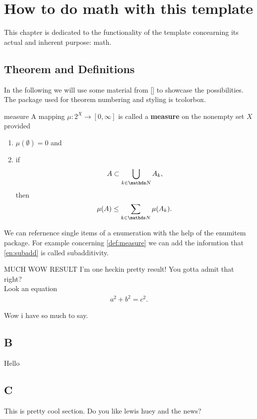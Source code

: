 \chapter{How to do math with this template}\label{ch:math}
This chapter is dedicated to the functionality of the template concearning its actual and 
inherent purpose: math. 
\section{Theorem and Definitions}
In the following we will use some material from [] to showcase the possibilities. 
The package used for theorem numbering and styling is tcolorbox.
\begin{definition}{}{measure}
A mapping $\mu:2^{X}\rightarrow[0,\infty]$ is called a {\bfseries measure} on the nonempty
set $X$ provided
\begin{enumerate}[roman, ref=\thetcbcounter (\roman*)]
\item $\mu(\emptyset) = 0$ and
\item \label{en:subadd} if
\begin{align*}
A\subset \bigcup_{k\in\N}A_k,
\end{align*}
then
\begin{align*}
\mu(A)\leq \sum_{k\in\N}\mu(A_k).
\end{align*}
\end{enumerate}
\end{definition}
We can refernence single items of a enumeration with the help of the enumitem package. 
For example concerning \cref{def:measure} we can add the informtion that \cref{en:subadd} is 
called subadditivity.
\begin{theorem}{MUCH WOW RESULT}{}
I'm one heckin pretty result! You gotta admit that right?\\
Look an equation
\begin{align*}
a^2+b^2=c^2.
\end{align*}
\end{theorem}

Wow i have so much to say.\newpage

\section{B}
Hello
\section{C}
This is pretty cool section.\newpage
Do you like lewis huey and the news?